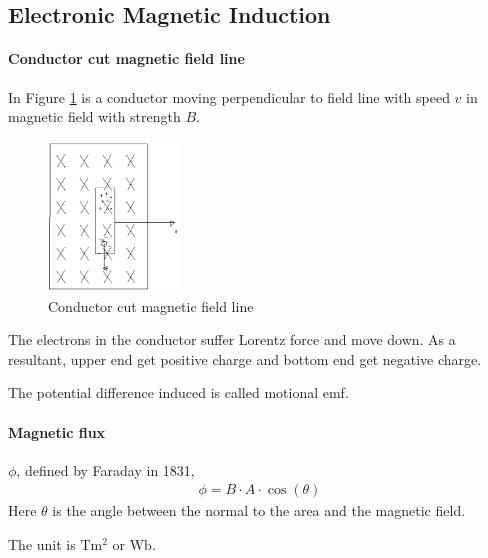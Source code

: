         

    \subsection{Electronic Magnetic Induction}
        
        \paragraph{Conductor cut magnetic field line}
            In Figure \ref{cut_fieldline} is a conductor moving perpendicular to field line with speed $v$ in magnetic field with strength $B$.

            \begin{figure}[H]
                \begin{center}
                    \includegraphics[height=4cm]{electromagnetism_charts/cut_fieldline.eps}
                \end{center}
                \caption{Conductor cut magnetic field line}
                \label{cut_fieldline}
            \end{figure}

            The electrons in the conductor suffer Lorentz force and move down. As a resultant, upper end get positive charge and bottom end get negative charge.

            The potential difference induced is called motional emf.
        
        \paragraph{Magnetic flux}
            $\phi$, defined by Faraday in 1831, 
            \begin{align}
                \phi = B \cdot A \cdot \cos(\theta)
            \end{align}
            Here $\theta$ is the angle between the normal to the area and the magnetic field.

            The unit is $\mathrm{Tm^2}$ or $\mathrm{Wb}$.


